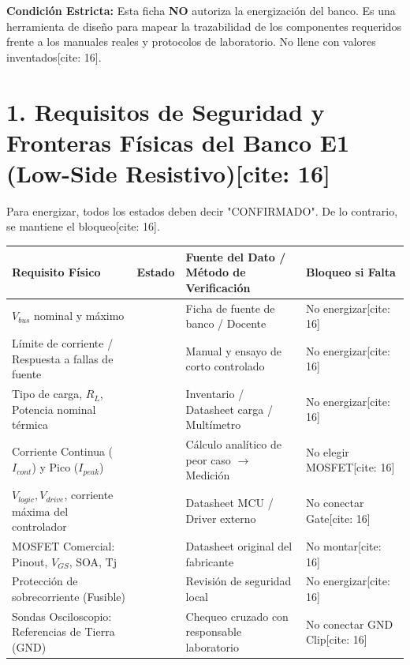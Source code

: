 \documentclass[10pt, a4paper, landscape]{article}
\begin{document}
\begin{tcolorbox}[colback=ucbblue!5, colframe=ucbblue, title=\textbf{Ficha de Especificación E1 y BOM Condicionada (Safety Gate)[cite: 16]}]
    \textbf{Condición Estricta:} Esta ficha \textbf{NO} autoriza la energización del banco. Es una herramienta de diseño para mapear la trazabilidad de los componentes requeridos frente a los manuales reales y protocolos de laboratorio. No llene con valores inventados[cite: 16].
\end{tcolorbox}

\section*{1. Requisitos de Seguridad y Fronteras Físicas del Banco E1 (Low-Side Resistivo)[cite: 16]}
Para energizar, todos los estados deben decir "CONFIRMADO". De lo contrario, se mantiene el bloqueo[cite: 16].

\renewcommand{\arraystretch}{1.5}
\begin{tabularx}{\textwidth}{|>{\raggedright\arraybackslash}p{6cm}|c|>{\raggedright\arraybackslash}X|p{3.5cm}|}
\hline
\rowcolor{gray!20}
\textbf{Requisito Físico} & \textbf{Estado} & \textbf{Fuente del Dato / Método de Verificación} & \textbf{Bloqueo si Falta} \\ \hline
$V_{bus}$ nominal y máximo & & Ficha de fuente de banco / Docente & No energizar[cite: 16] \\ \hline
Límite de corriente / Respuesta a fallas de fuente & & Manual y ensayo de corto controlado & No energizar[cite: 16] \\ \hline
Tipo de carga, $R_L$, Potencia nominal térmica & & Inventario / Datasheet carga / Multímetro & No energizar[cite: 16] \\ \hline
Corriente Continua ($I_{cont}$) y Pico ($I_{peak}$) & & Cálculo analítico de peor caso $\to$ Medición & No elegir MOSFET[cite: 16] \\ \hline
$V_{logic}, V_{drive}$, corriente máxima del controlador & & Datasheet MCU / Driver externo & No conectar Gate[cite: 16] \\ \hline
MOSFET Comercial: Pinout, $V_{GS}$, SOA, Tj & & Datasheet original del fabricante & No montar[cite: 16] \\ \hline
Protección de sobrecorriente (Fusible) & & Revisión de seguridad local & No energizar[cite: 16] \\ \hline
Sondas Osciloscopio: Referencias de Tierra (GND) & & Chequeo cruzado con responsable laboratorio & No conectar GND Clip[cite: 16] \\ \hline
\end{tabularx}
\end{document}
